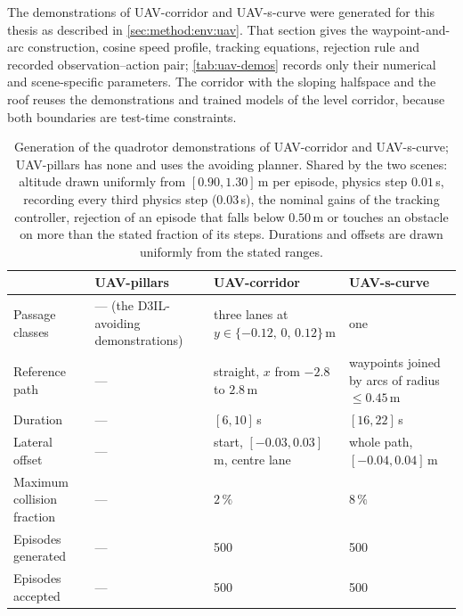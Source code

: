 The demonstrations of UAV-corridor and UAV-s-curve were generated for this thesis as described in
\autoref{sec:method:env:uav}. That section gives the waypoint-and-arc construction, cosine speed profile,
tracking equations, rejection rule and recorded observation--action pair; \autoref{tab:uav-demos} records
only their numerical and scene-specific parameters. The corridor with the sloping halfspace and the roof
reuses the demonstrations and trained models of the level corridor, because both boundaries are test-time
constraints.

\begin{table}[!htbp]
  \caption[Quadrotor demonstrations]{Generation of the quadrotor demonstrations of UAV-corridor and
  UAV-s-curve; UAV-pillars has none and uses the avoiding planner. Shared by the two scenes:
  altitude drawn uniformly from $[0.90,1.30]$\,m per episode, physics step $0.01$\,s, recording every
  third physics step ($0.03$\,s), the nominal gains of the tracking controller, rejection of an episode
  that falls below $0.50$\,m or touches an obstacle on more than the stated fraction of its steps.
  Durations and offsets are drawn uniformly from the stated ranges.}
  \label{tab:uav-demos}
  \centering
  \footnotesize
  \setlength{\tabcolsep}{3pt}
  \renewcommand{\arraystretch}{0.92}
  \begin{tabularx}{\linewidth}{@{}l L L L@{}}
    \toprule
    & UAV-pillars & UAV-corridor & UAV-s-curve \\
    \midrule
    Passage classes & --- (the D3IL-avoiding demonstrations) & three lanes at $y\in\{-0.12,\,0,\,0.12\}$\,m & one \\
    Reference path & --- & straight, $x$ from $-2.8$ to $2.8$\,m & waypoints joined by arcs of radius $\le0.45$\,m \\
    Duration & --- & $[6,10]$\,s & $[16,22]$\,s \\
    Lateral offset & --- & start, $[-0.03,0.03]$\,m, centre lane & whole path, $[-0.04,0.04]$\,m \\
    Maximum collision fraction & --- & $2\,\%$ & $8\,\%$ \\
    Episodes generated & --- & 500 & 500 \\
    Episodes accepted & --- & 500 & 500 \\
    \bottomrule
  \end{tabularx}
\end{table}

